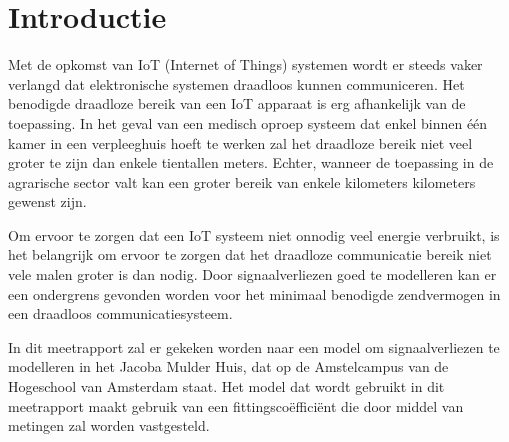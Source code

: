 \section{Introductie} \label{sec:introduction}

Met de opkomst van IoT (Internet of Things) systemen wordt er steeds vaker verlangd dat elektronische systemen draadloos kunnen communiceren. Het benodigde draadloze bereik van een IoT apparaat is erg afhankelijk van de toepassing. In het geval van een medisch oproep systeem dat enkel binnen één kamer in een verpleeghuis hoeft te werken zal het draadloze bereik niet veel groter te zijn dan enkele tientallen meters. Echter, wanneer de toepassing in de agrarische sector valt kan een groter bereik van enkele kilometers kilometers gewenst zijn. 

Om ervoor te zorgen dat een IoT systeem niet onnodig veel energie verbruikt, is het belangrijk om ervoor te zorgen dat het draadloze communicatie bereik niet vele malen groter is dan nodig. Door signaalverliezen goed te modelleren kan er een ondergrens gevonden worden voor het minimaal benodigde zendvermogen in een draadloos communicatiesysteem.

In dit meetrapport zal er gekeken worden naar een model om signaalverliezen te modelleren in het Jacoba Mulder Huis, dat op de 
Amstelcampus van de Hogeschool van Amsterdam staat. Het model dat wordt gebruikt in dit meetrapport maakt gebruik van een fittingscoëfficiënt die door middel van metingen zal worden vastgesteld.



